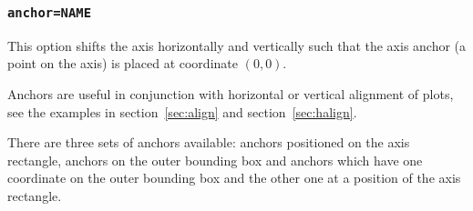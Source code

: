 \subsubsection{\texttt{anchor=NAME}}
\label{option:anchor}%
This option shifts the axis horizontally and vertically such that the axis anchor (a point on the axis) is placed at coordinate $(0,0)$.

Anchors are useful in conjunction with horizontal or vertical alignment of plots, see the examples in section~\ref{sec:align} and section~\ref{sec:halign}.

There are three sets of anchors available: anchors positioned on the axis rectangle, anchors on the outer bounding box and anchors which have one coordinate on the outer bounding box and the other one at a position of the axis rectangle.

